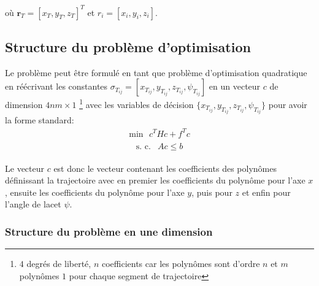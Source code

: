 \documentclass{article}
\begin{document}
où $\boldsymbol{r}_T = [x_T, y_T, z_T]^T$ et $r_i = [x_i, y_i, z_i]$.

\subsection{Structure du problème d'optimisation}

Le problème peut être formulé en tant que problème d'optimisation quadratique en réécrivant les constantes $\sigma_{T_{ij}} = [x_{T_{ij}}, y_{T_{ij}}, z_{T_{ij}}, \psi_{T_{ij}}]$ en un vecteur $c$ de dimension $4nm \times 1$ \footnote{$4$ degrés de liberté, $n$ coefficients car les polynômes sont d'ordre $n$ et $m$ polynômes $1$ pour chaque segment de trajectoire} avec les variables de décision $\{x_{T_{ij}}, y_{T_{ij}}, z_{T_{ij}}, \psi_{T_{ij}}\}$ pour avoir la forme standard:
\begin{align}\label{eq:opt_quad}
\text{min}\ \ \ c^THc+f^Tc
\end{align}\begin{align*}
	\begin{array}{ll}
	\text{s. c.} & Ac\leq b
	\end{array}
\end{align*}

Le vecteur $c$ est donc le vecteur contenant les coefficients des polynômes définissant la trajectoire avec en premier les coefficients du polynôme pour l'axe $x$, ensuite les coefficients du polynôme pour l'axe $y$, puis pour $z$ et enfin pour l'angle de lacet $\psi$.

\subsubsection{Structure du problème en une dimension}
\end{document}

